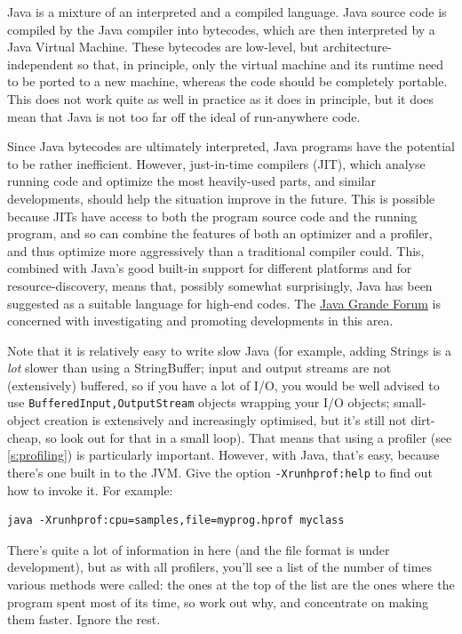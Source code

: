 \documentclass[11pt,oneside,chapters]{starlink}
\begin{document}
Java is a mixture of an interpreted and a compiled
language.  Java source code is compiled by the Java
compiler into bytecodes, which are then interpreted by a
Java Virtual Machine.  These bytecodes are low-level, but
architecture-independent so that, in principle, only the
virtual machine and its runtime need to be ported to a new
machine, whereas the code should be completely portable.
This does not work quite as well in practice as it does in
principle, but it does mean that Java is not too far off
the ideal of run-anywhere code.

Since Java bytecodes are ultimately interpreted, Java
programs have the potential to be rather inefficient.
However, just-in-time compilers (JIT), which analyse
running code and optimize the most heavily-used parts, and
similar developments, should help the situation improve in
the future.  This is possible because JITs have access to
both the program source code and the running program, and
so can combine the features of both an optimizer and a
profiler, and thus optimize more aggressively than a
traditional compiler could.  This, combined with Java's
good built-in support for different platforms and for
resource-discovery, means that, possibly somewhat
surprisingly, Java has been suggested as a suitable
language for high-end codes.  The
\href{http://www.javagrande.org/}{Java Grande Forum}
is concerned with investigating and
promoting developments in this area.

Note that it is relatively easy to write slow Java (for
example, adding Strings is a \emph{lot} slower than
using a StringBuffer; input and output streams are not
(extensively) buffered, so if you have a lot of I/O, you
would be well advised to use
\texttt{Buffered{Input,Output}Stream} objects wrapping
your I/O objects; small-object creation is extensively and
increasingly optimised, but it's still not dirt-cheap, so
look out for that in a small loop).  That means that using
a profiler (see \ref{s:profiling}) is particularly
important.  However, with Java, that's easy, because
there's one built in to the JVM.  Give the option
\texttt{-Xrunhprof:help} to find out how to invoke it.
For example: 

\begin{verbatim}
java -Xrunhprof:cpu=samples,file=myprog.hprof myclass
\end{verbatim}

There's quite a lot of information in
here (and the file format is under development), but as
with all profilers, you'll see a list of the number of
times various methods were called: the ones at the top of
the list are the ones where the program spent most of its
time, so work out why, and concentrate on making them
faster.  Ignore the rest.
\end{document}
